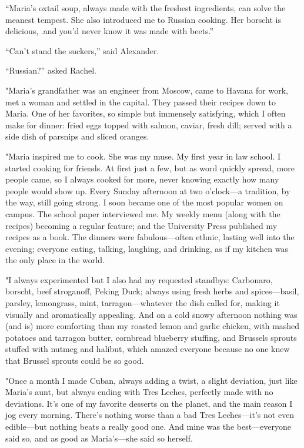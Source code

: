 ``Maria's oxtail soup, always made with the freshest ingredients, can
solve the meanest tempest. She also introduced me to Russian cooking.
Her borscht is delicious, .and you'd never know it was made with
beets.''

``Can't stand the suckers,'' said Alexander.

``Russian?'' asked Rachel.

"Maria's grandfather was an engineer from Moscow, came to Havana for
work, met a woman and settled in the capital. They passed their recipes
down to Maria. One of her favorites, so simple but immensely satisfying,
which I often make for dinner: fried eggs topped with salmon, caviar,
fresh dill; served with a side dish of parsnips and sliced oranges.

"Maria inspired me to cook. She was my muse. My first year in law
school. I started cooking for friends. At first just a few, but as word
quickly spread, more people came, so I always cooked for more, never
knowing exactly how many people would show up. Every Sunday afternoon at
two o'clock---a tradition, by the way, still going strong. I soon became
one of the most popular women on campus. The school paper interviewed
me. My weekly menu (along with the recipes) becoming a regular feature;
and the University Press published my recipes as a book. The dinners
were fabulous---often ethnic, lasting well into the evening; everyone
eating, talking, laughing, and drinking, as if my kitchen was the only
place in the world.

"I always experimented but I also had my requested standbys: Carbonaro,
borscht, beef stroganoff, Peking Duck; always using fresh herbs and
spices---basil, parsley, lemongrass, mint, tarragon---whatever the dish
called for, making it visually and aromatically appealing. And on a cold
snowy afternoon nothing was (and is) more comforting than my roasted
lemon and garlic chicken, with mashed potatoes and tarragon butter,
cornbread blueberry stuffing, and Brussels sprouts stuffed with nutmeg
and halibut, which amazed everyone because no one knew that Brussel
sprouts could be so good.

"Once a month I made Cuban, always adding a twist, a slight deviation,
just like Maria's aunt, but always ending with Tres Leches, perfectly
made with no deviations. It's one of my favorite desserts on the planet,
and the main reason I jog every morning. There's nothing worse than a
bad Tres Leches---it's not even edible---but nothing beats a really good
one. And mine was the best---everyone said so, and as good as
Maria's---she said so herself.

